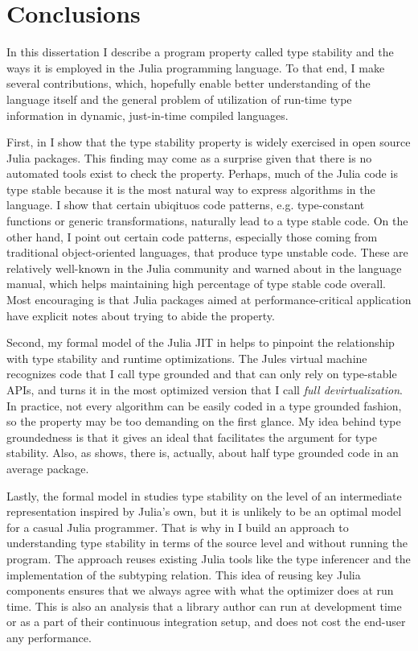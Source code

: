 \chapter{Conclusions}%
\label{chap:conc}

In this dissertation I describe a program property called type stability and the
ways it is employed in the Julia programming language. To that end, I make
several contributions, which, hopefully enable better understanding of the
language itself and the general problem of utilization of run-time type
information in dynamic, just-in-time compiled languages.

First, in  I show that the type stability property is
widely exercised in open source Julia packages. This finding may come as a
surprise given that there is no automated tools exist to check the property.
Perhaps, much of the Julia code is type stable because it is the most natural
way to express algorithms in the language. I show that certain ubiqituos code
patterns, e.g. type-constant functions or generic transformations, naturally
lead to a type stable code. On the other hand, I point out certain code
patterns, especially those coming from traditional object-oriented languages,
that produce type unstable code. These are relatively well-known in the Julia
community and warned about in the language manual, which helps maintaining high
percentage of type stable code overall. Most encouraging is that Julia packages
aimed at performance-critical application have explicit notes about trying to
abide the property.

Second, my formal model of the Julia JIT in  helps to
pinpoint the relationship with type stability and runtime optimizations. The
Jules virtual machine recognizes code that I call type grounded and that can
only rely on type-stable APIs, and turns it in the most optimized version that I
call \emph{full devirtualization}. In practice, not every algorithm can be
easily coded in a type grounded fashion, so the property may be too demanding on
the first glance. My idea behind type groundedness is that it gives an ideal
that facilitates the argument for type stability. Also, as
 shows, there is, actually, about half type grounded
code in an average package.

Lastly, the formal model in  studies type stability on the
level of an intermediate representation inspired by Julia's own, but it is
unlikely to be an optimal model for a casual Julia programmer. That is why in
 I build an approach to understanding type stability in
terms of the source level and without running the program. The approach
reuses existing Julia tools like the type inferencer and the implementation of
the subtyping relation. This idea of reusing key Julia components ensures that
we always agree with what the optimizer does at run time. This is also an
analysis that a library author can run at development time or as a part of their
continuous integration setup, and does not cost the end-user any performance.
